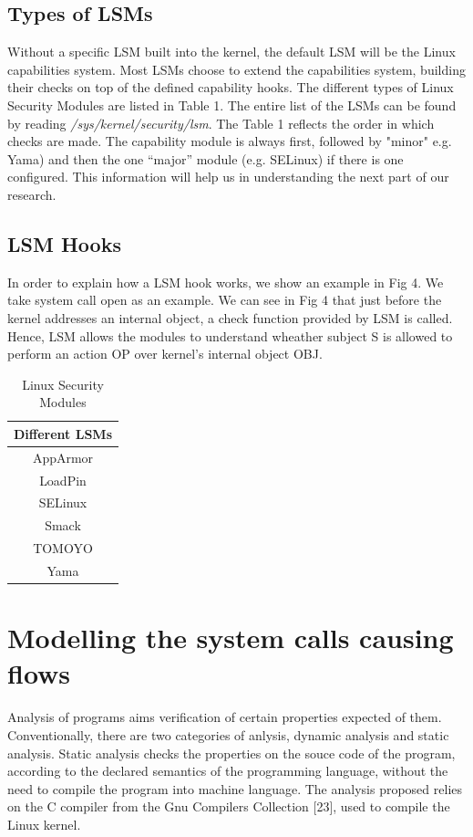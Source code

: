 \subsection{Types of LSMs}
Without a specific LSM built into the kernel, the default LSM will be the Linux capabilities system. Most LSMs choose to extend the capabilities system, building their checks on top of the defined capability hooks.
\vskip 0.1in
The different types of Linux Security Modules are listed in Table 1. The entire list of the LSMs can be found by reading \textit{/sys/kernel/security/lsm}. The Table 1 reflects the order in which checks are made. The capability module is always first, followed by "minor" e.g. Yama) and then the one “major” module (e.g. SELinux) if there is one configured. This information will help us in understanding the next part of our research. 
\subsection{LSM Hooks}
In order to explain how a LSM hook works, we show an example in Fig 4. We take system call open as an example. We can see in Fig 4 that just before the kernel addresses an internal object, a check function provided by LSM is called. Hence, LSM allows the modules to understand wheather subject S is allowed to perform an action OP over kernel's internal object OBJ.


\begin{table}[ht]
	\caption{Linux Security Modules}
	\centering
	\begin{tabular}{c}
		\hline\hline 
		Different LSMs \\
		\hline
		AppArmor \\
		LoadPin  \\
		SELinux  \\
		Smack   \\
		TOMOYO \\
		Yama \\
	\end{tabular}	
\end{table}


\section{Modelling the system calls causing flows}
Analysis of programs aims verification of certain properties expected of them. Conventionally, there are two categories of anlysis, dynamic analysis and static analysis. Static analysis checks the properties on the souce code of the program, according to the declared semantics of the programming language, without the need to compile the program into machine language. 
The analysis proposed relies on the C compiler from the
Gnu Compilers Collection [23], used to compile the Linux
kernel.

